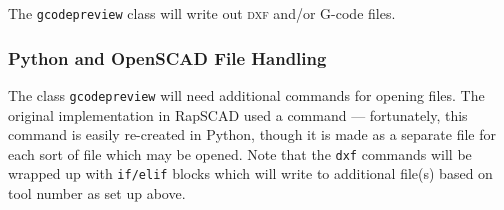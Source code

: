 \documentclass{ltxdoc}
\begin{document}
The \verb|gcodepreview| class will write out \textsc{dxf} and/or G-code files.


\subsubsection{Python and OpenSCAD File Handling}

The class \verb|gcodepreview| will need additional commands for opening files. The original implementation in {RapSCAD} used a command  --- fortunately, this command is easily re-created in Python, though it is made as a separate file for each sort of file which may be opened. Note that the \verb|dxf| commands will be wrapped up with \verb|if/elif| blocks which will write to additional file(s) based on tool number as set up above.
\end{document}
